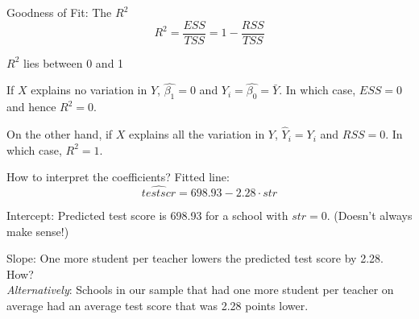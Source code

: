 \documentclass{./../div_teaching_slides}
\begin{document}
\begin{frame}{Goodness of Fit: The $R^2$}
$$ R^2 = \frac{ESS}{TSS} = 1-\frac{RSS}{TSS} $$

\vspace{1em}
$R^2$ lies between 0 and 1 \\
\begin{witemize}
  \item If $X$ explains no variation in $Y$, $\hat{\beta_1}=0$ and $ \hat{Y_i} = \hat{\beta_0} = \bar{Y}$. In which case, $ESS=0$ and hence $R^2=0$.
  \item On the other hand, if $X$ explains all the variation in $Y$, $\hat{Y}_i=Y_i$ and $RSS=0$. In which case, $R^2=1$.
\end{witemize}
\end{frame}

\begin{frame}{How to interpret the coefficients?}
Fitted line:
$$ \hat{testscr} = 698.93 -2.28 \cdot str $$
\begin{witemize}
  \item Intercept: Predicted test score is 698.93 for a school with $str=0$. (Doesn't always make sense!)
  \item Slope: One more student per teacher lowers the predicted test score by 2.28. How? \\ \vspace{0.25em}
   \textit{Alternatively}: Schools in our sample that had one more student per teacher on average had an average test score that was 2.28 points lower.
\end{witemize}
\end{frame}
\end{document}
